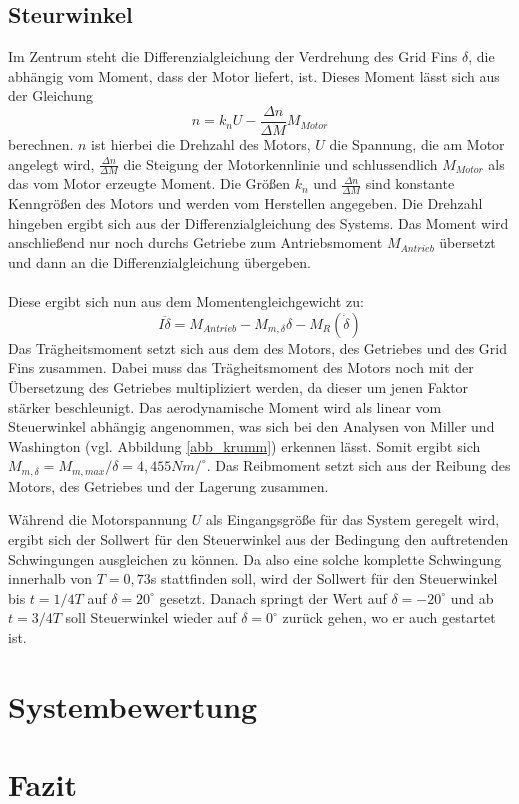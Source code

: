 \subsection{Steurwinkel}
Im Zentrum steht die Differenzialgleichung der Verdrehung des Grid Fins $\delta$, die abhängig vom Moment, dass der Motor liefert, ist. Dieses Moment lässt sich aus der Gleichung
\begin{equation}
	n =k_nU-\frac{\Delta n}{\Delta M}M_{Motor}
\end{equation}
berechnen. $n$ ist hierbei die Drehzahl des Motors, $U$ die Spannung, die am Motor angelegt wird, $\frac{\Delta n}{\Delta M}$ die Steigung der Motorkennlinie und schlussendlich $M_{Motor}$ als das vom Motor erzeugte Moment. Die Größen $k_n$ und $\frac{\Delta n}{\Delta M}$ sind konstante Kenngrößen des Motors und werden vom Herstellen angegeben. Die Drehzahl hingeben ergibt sich aus der Differenzialgleichung des Systems. Das Moment wird anschließend nur noch durchs Getriebe zum Antriebsmoment $M_{Antrieb}$ übersetzt und dann an die Differenzialgleichung übergeben.
\\~\\
Diese ergibt sich nun aus dem Momentengleichgewicht zu:
\begin{equation}
	I\ddot{\delta} = M_{Antrieb} - M_{m, \delta}\delta - M_{R}(\dot{\delta})
\end{equation}
Das Trägheitsmoment setzt sich aus dem des Motors, des Getriebes und des Grid Fins zusammen. Dabei muss das Trägheitsmoment des Motors noch mit der Übersetzung des Getriebes multipliziert werden, da dieser um jenen Faktor stärker beschleunigt. Das aerodynamische Moment wird als linear vom Steuerwinkel abhängig angenommen, was sich bei den Analysen von Miller und Washington \cite{synopsis} (vgl. Abbildung \ref{abb_krumm}) erkennen lässt. Somit ergibt sich $M_{m, \delta} = M_{m, max}/\delta = 4,455Nm/^\circ$. Das Reibmoment setzt sich aus der Reibung des Motors, des Getriebes und der Lagerung zusammen.

Während die Motorspannung $U$ als Eingangsgröße für das System geregelt wird, ergibt sich der Sollwert für den Steuerwinkel aus der Bedingung den auftretenden Schwingungen ausgleichen zu können. Da also eine solche komplette Schwingung innerhalb von $T = 0,73$s stattfinden soll, wird der Sollwert für den Steuerwinkel bis $t = 1/4T$ auf $\delta = 20^\circ$ gesetzt. Danach springt der Wert auf $\delta = -20^\circ$ und ab $t = 3/4T$ soll Steuerwinkel wieder auf $\delta = 0^\circ$ zurück gehen, wo er auch gestartet ist.
\section{Systembewertung}

\section{Fazit}